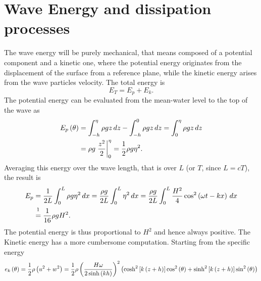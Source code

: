 \section{Wave Energy and dissipation processes}\label{Energy}
The wave energy will be purely mechanical, that means composed of a potential component and a kinetic one, where the potential energy originates from the displacement of the surface from a reference plane, while the kinetic energy arises from the wave particles velocity. The total energy is 
\begin{equation}
E_{T}=E_{p}+E_{k}.
\end{equation}
The potential energy can be evaluated from the mean-water level to the top of the wave as
\begin{align*}
E_{p}\left( \theta \right)&=\int_{-h}^{\eta} \rho gz\,dz-\int_{-h}^{0}\rho gz \,dz=\int_{0}^{\eta}\rho gz \,dz\\
&=\rho g \left.\dfrac{z^{2}}{2}\right|^{\eta}_{0}=\dfrac{1}{2}\rho g\eta^{2}.
\end{align*}
Averaging this energy over the wave length, that is over $L$ (or $T$, since $L=cT$), the result is 
\begin{align*}
E_{p}&=\dfrac{1}{2L}\int_{0}^{L}\rho g \eta^{2}\,dx=\dfrac{\rho g}{2L}\int_{0}^{L} \eta^{2}\,dx=\dfrac{\rho g}{2L}\int_{0}^{L} \dfrac{H^{2}}{4}\cos^{2}\rbkt{\omega t-kx}\,dx\\
&\overset{\footnotemark}{=}\dfrac{1}{16}\rho g H^{2}.
\end{align*}
The potential energy is thus proportional to $H^{2}$ and hence always positive. The Kinetic energy has a more cumbersome computation. Starting from the specific energy
\begin{equation*}
e_{k}\left( \theta \right)=\dfrac{1}{2}\rho\left( u^{2}+w^{2} \right)=\dfrac{1}{2}\rho\left( \dfrac{H\omega}{2\sinh\left( kh \right)} \right)^{2}\left( \cosh^{2}\left[ k\left( z+h \right) \right]\cos^{2}\left( \theta \right)+
\sinh^{2}\left[ k\left( z+h \right) \right]\sin^{2}\left( \theta \right) \right)
\end{equation*}
